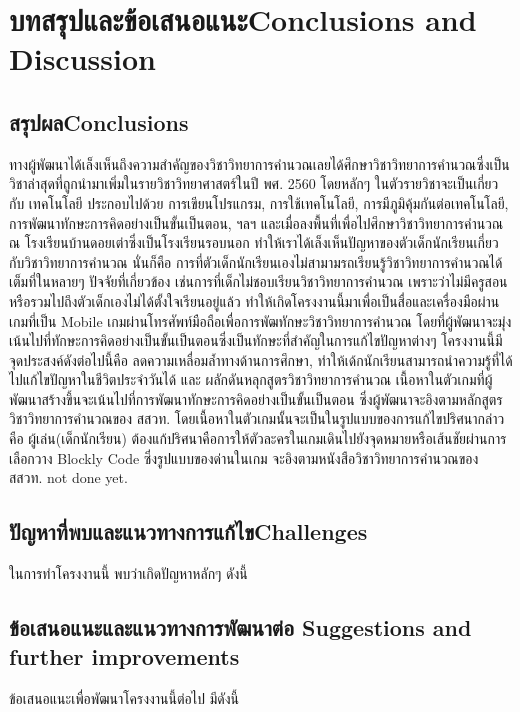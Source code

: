 \chapter{\ifcpe บทสรุปและข้อเสนอแนะ\else Conclusions and Discussion\fi}

\section{\ifcpe สรุปผล\else Conclusions\fi}

ทางผู้พัฒนาได้เล็งเห็นถึงความสำคัญของวิชาวิทยาการคำนวณเลยได้ศึกษาวิชาวิทยาการคำนวณซึ่งเป็นวิชาล่าสุดที่ถูกนำมาเพิ่มในรายวิชาวิทยาศาสตร์ในปี พศ. 2560 โดยหลักๆ ในตัวรายวิชาจะเป็นเกี่ยวกับ
เทคโนโลยี ประกอบไปด้วย การเขียนโปรแกรม, การใช้เทคโนโลยี, การมีภูมิคุ้มกันต่อเทคโนโลยี, การพัฒนาทักษะการคิดอย่างเป็นขั้นเป็นตอน, ฯลฯ
และเมื่อลงพื้นที่เพื่อไปศึกษาวิชาวิทยาการคำนวณ ณ โรงเรียนบ้านดอยเต่าซึ่งเป็นโรงเรียนรอบนอก ทำให้เราได้เล็งเห็นปัญหาของตัวเด็กนักเรียนเกี่ยวกับวิชาวิทยาการคำนวณ นั่นก็คือ
การที่ตัวเด็กนักเรียนเองไม่สามามรถเรียนรู้วิชาวิทยาการคำนวณได้เต็มที่ในหลายๆ ปัจจัยที่เกี่ยวข้อง เช่นการที่เด็กไม่ชอบเรียนวิชาวิทยาการคำนวณ
เพราะว่าไม่มีครูสอนหรือรวมไปถึงตัวเด็กเองไม่ได้ตั้งใจเรียนอยู่แล้ว ทำให้เกิดโครงงานนี้มาเพื่อเป็นสื่อและเครื่องมือผ่านเกมที่เป็น Mobile เกมผ่านโทรศัพท์มือถือเพื่อการพัฒทักษะวิชาวิทยาการคำนวณ
โดยที่ผู้พัฒนาจะมุ่งเน้นไปที่ทักษะการคิดอย่างเป็นขั้นเป็นตอนซึ่งเป็นทักษะที่สำคัญในการแก้ไขปัญหาต่างๆ
โครงงานนี้มีจุดประสงค์ดังต่อไปนี้คือ ลดความเหลื่อมล้ำทางด้านการศึกษา, ทำให้เด้กนักเรียนสามารถนำความรู้ที่ได้ไปแก้ไขปัญหาในชีวิตประจำวันได้ และ
ผลักดันหลุกสูตรวิชาวิทยาการคำนวณ เนื้อหาในตัวเกมที่ผู้พัฒนาสร้างขึ้นจะเน้นไปที่การพัฒนาทักษะการคิดอย่างเป็นขั้นเป็นตอน
ซึ่งผู้พัฒนาจะอิงตามหลักสูตรวิชาวิทยาการคำนวณของ สสวท. โดยเนื้อหาในตัวเกมนั้นจะเป็นในรูปแบบของการแก้ไขปริศนากล่าวคือ ผู้เล่น(เด็กนักเรียน)
ต้องแก้ปริศนาคือการให้ตัวละครในเกมเดินไปยังจุดหมายหรือเส้นชัยผ่านการเลือกวาง Blockly Code ซึ่งรูปแบบของด่านในเกม
จะอิงตามหนังสือวิชาวิทยาการคำนวณของ สสวท. {not done yet.}

\section{\ifcpe ปัญหาที่พบและแนวทางการแก้ไข\else Challenges\fi}

ในการทำโครงงานนี้ พบว่าเกิดปัญหาหลักๆ ดังนี้

\section{\ifcpe%
ข้อเสนอแนะและแนวทางการพัฒนาต่อ
\else%
Suggestions and further improvements
\fi
}

ข้อเสนอแนะเพื่อพัฒนาโครงงานนี้ต่อไป มีดังนี้
